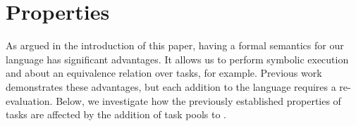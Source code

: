 \section{Properties}
\label{sec:properties}

As argued in the introduction of this paper, having a formal semantics for our \TOP language has significant advantages.
It allows us to perform symbolic execution and about an equivalence relation over tasks, for example.
Previous work demonstrates these advantages, but each addition to the language requires a re-evaluation.
Below, we investigate how the previously established properties of tasks are affected by the addition of task pools to \TOPHAT.



% 
